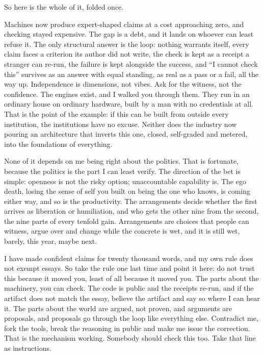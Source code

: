 \documentclass[11pt]{article}
\begin{document}
So here is the whole of it, folded once.

Machines now produce expert-shaped claims at a cost approaching zero, and checking stayed expensive. The gap is a debt, and it lands on whoever can least refuse it. The only structural answer is the loop: nothing warrants itself, every claim faces a criterion its author did not write, the check is kept as a receipt a stranger can re-run, the failure is kept alongside the success, and ``I cannot check this'' survives as an answer with equal standing, as real as a pass or a fail, all the way up. Independence is dimensions, not vibes. Ask for the witness, not the confidence. The engines exist, and I walked you through them. They run in an ordinary house on ordinary hardware, built by a man with no credentials at all. That is the point of the example: if this can be built from outside every institution, the institutions have no excuse. Neither does the industry now pouring an architecture that inverts this one, closed, self-graded and metered, into the foundations of everything.

None of it depends on me being right about the politics. That is fortunate, because the politics is the part I can least verify. The direction of the bet is simple: openness is not the risky option; unaccountable capability is. The ego death, losing the sense of self you built on being the one who knows, is coming either way, and so is the productivity. The arrangements decide whether the first arrives as liberation or humiliation, and who gets the other nine from the second, the nine parts of every tenfold gain. Arrangements are choices that people can witness, argue over and change while the concrete is wet, and it is still wet, barely, this year, maybe next.

I have made confident claims for twenty thousand words, and my own rule does not exempt essays. So take the rule one last time and point it here: do not trust this because it moved you, least of all because it moved you. The parts about the machinery, you can check. The code is public and the receipts re-run, and if the artifact does not match the essay, believe the artifact and say so where I can hear it. The parts about the world are argued, not proven, and arguments are proposals, and proposals go through the loop like everything else. Contradict me, fork the tools, break the reasoning in public and make me issue the correction. That is the mechanism working. Somebody should check this too. Take that line as instructions.
\end{document}
